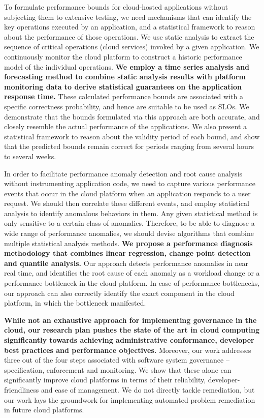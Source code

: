 To formulate performance bounds for cloud-hosted applications without subjecting them to extensive testing,
we need mechanisms that can identify the key operations executed by an application, and a
statistical framework to reason about the performance of those operations. We use static
analysis to extract the sequence of critical operations (cloud services) invoked by a given application.
We continuously monitor the cloud platform to construct a historic performance model of the individual operations.
\textbf{We employ a time series analysis and forecasting method to combine static analysis results with
platform monitoring data to
derive statistical guarantees on the application response time.} These calculated performance
bounds are associated with a specific correctness probability, and hence are suitable to be used
as SLOs. We demonstrate that the bounds formulated via this approach are 
both accurate, and closely resemble the actual performance of the applications. We also present a statistical framework
to reason about the validity period of each bound, and show that the predicted bounds
remain correct for periods ranging from several hours to several weeks.

In order to facilitate performance anomaly detection and root cause analysis without instrumenting
application code, we need to capture various performance events that occur in the cloud platform
when an application responds to a user request. We should then correlate these different events,
and employ statistical analysis to identify anomalous behaviors in them. Any given statistical
method is only sensitive to a certain class of anomalies. Therefore, to be able to diagnose a wide range of
performance anomalies, we should devise algorithms that combine multiple statistical analysis
methods. \textbf{We propose a performance diagnosis methodology that combines linear regression, change point
detection and quantile analysis.} Our approach detects performance anomalies in near real time,
and identifies the root cause of each anomaly as a workload change or a performance bottleneck
in the cloud platform. In case of performance bottlenecks, our approach can also correctly identify
the exact component in the cloud platform, in which the bottleneck manifested.

\textbf{While not an exhaustive approach for implementing governance in the cloud, our research plan
pushes the state of the art in cloud computing significantly towards achieving
administrative conformance, developer best practices and performance objectives.} Moreover,
our work addresses three out of the four steps associated with software system governance --
specification, enforcement and monitoring. We show that these alone can significantly improve cloud platforms
in terms of their reliability, developer-friendliness and ease of management. 
We do not directly tackle remediation, but our work
lays the groundwork for implementing automated problem remediation in future cloud platforms.

